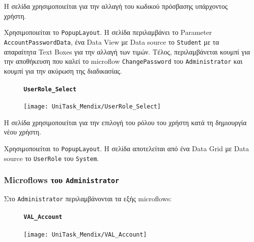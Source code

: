                     Η σελίδα χρησιμοποιείται για την αλλαγή του κωδικού πρόσβασης υπάρχοντος χρήστη.

                    Χρησιμοποιείται το \texttt{PopupLayout}. Η σελίδα περιλαμβάνει το Parameter \linebreak \texttt{AccountPasswordData}, ένα Data View με Data source το \texttt{Student} με τα απαραίτητα Text Boxes για την αλλαγή των τιμών. Τέλος, περιλαμβάνεται κουμπί για την αποθήκευση που καλεί το microflow \texttt{ChangePassword} του \texttt{Administrator} και κουμπί για την ακύρωση της διαδικασίας.

                \begin{figure}[H] \noindent
                    \paragraph{\texttt{UserRole\_Select}}
                    \begin{center}
                        \texttt{[image: UniTask\_Mendix/UserRole\_Select]}
                    \end{center}
                \end{figure}

                    Η σελίδα χρησιμοποιείται για την επιλογή του ρόλου του χρήστη κατά τη δημιουργία νέου χρήστη.

                    Χρησιμοποιείται το \texttt{PopupLayout}. Η σελίδα αποτελείται από ένα Data Grid με Data source το \texttt{UserRole} του \texttt{System}.

            \subsubsection{Microflows του \texttt{Administrator}}
                Στο \texttt{Administrator} περιλαμβάνονται τα εξής microflows:

                \begin{figure}[H] \noindent
                    \paragraph{\texttt{VAL\_Account}}
                    \begin{center}
                        \texttt{[image: UniTask\_Mendix/VAL\_Account]}
                    \end{center}
                \end{figure}

